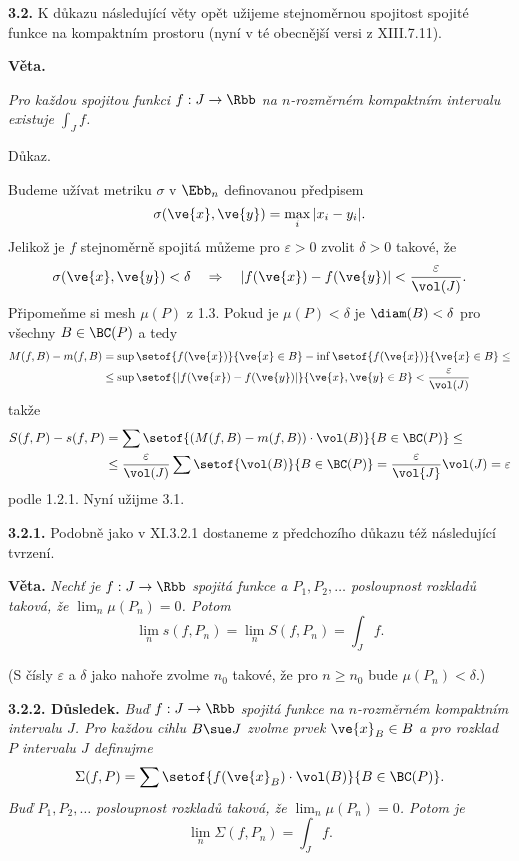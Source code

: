 \documentclass[12pt]{article}
\begin{document}
\bigskip


{\bf 3.2.} K důkazu následující věty opět užijeme stejnoměrnou spojitost spojité funkce na kompaktním prostoru (nyní v té obecnější versi z XIII.7.11).

\medskip


 {\bf Věta.} {\em Pro každou spojitou funkci  $f:J\to\Rbb$ na  $n$-rozměrném kompaktním intervalu existuje
$\int_Jf$.

Důkaz.} Budeme užívat metriku $\sigma$ v $\Ebb_n$ definovanou předpisem
$$
\sigma(\ve{x},\ve{y})=\max_i|x_i-y_i|.
$$ 
Jelikož je $f$ stejnoměrně spojitá můžeme pro $\varepsilon>0$ zvolit $\delta>0$ takové, že
$$
\sigma(\ve{x},\ve{y})< \delta \quad\Rightarrow\quad |f(\ve{x})-f(\ve{y})|< \frac{\varepsilon}{\vol(J)}.
$$
Připomeňme si  mesh $\mu(P)$ z 1.3.   Pokud je $\mu(P)<\delta$ je $\diam(B)<\delta$ pro všechny $B\in\BC(P)$
a tedy
$$
\begin{aligned}
M(f,B)-m(f,B)&=\sup\setof{f(\ve{x})}{\ve{x}\in B}-\inf\setof{f(\ve{x})}{\ve{x}\in B}\leq
\\
 &\leq\sup\setof{|f(\ve{x})-f(\ve{y})|}{\ve{x},\ve{y}\in B}<\frac{\varepsilon}{\vol(J)}
 \end{aligned}
 $$
takže
 $$
 \begin{aligned}
 S(f,P)-s(f,P)&=\sum\setof{(M(f,B)-m(f,B))\cdot\vol(B)}{B\in\BC(P)}\leq\\
&\leq\frac{\varepsilon}{\vol(J)}\sum\setof{\vol(B)}{B\in\BC(P)}=\frac{\varepsilon}{\vol{J}}\vol(J)=\varepsilon
 \end{aligned}
 $$
 podle 1.2.1. 
Nyní užijme 3.1. \sq
 
 \medskip
 
 {\bf 3.2.1.} Podobně jako v XI.3.2.1  dostaneme z předchozího důkazu též následující tvrzení.
 
 \smallskip
 
 {\bf Věta.} {\em  Nechť je   $f:J\to\Rbb$ spojitá funkce a $P_1,P_2,\dots$ posloupnost rozkladů taková, že 
 $\lim_n\mu(P_n)=0$. Potom
 $$
 \lim_n s(f,P_n)=\lim_n S(f,P_n)=\int_J f.
 $$}
 
 (S čísly $\varepsilon$ a $\delta$ jako nahoře zvolme $n_0$ takové, že pro $n\geq n_0$ bude $\mu(P_n)<\delta$.)
 
 \medskip

{\bf 3.2.2. Důsledek.} {\em Buď   $f:J\to\Rbb$ spojitá funkce na  $n$-rozměrném kompaktním
 intervalu $J$. Pro každou cihlu $B\sue J$ zvolme prvek $\ve{x}_B\in B$ a pro rozklad $P$ intervalu $J$
definujme
 $$
 \Sigma(f,P)=\sum\setof{f(\ve{x}_B)\cdot\vol(B)}{B\in\BC(P)}.
 $$
Buď $P_1,P_2,\dots$ posloupnost rozkladů taková, že
 $\lim_n\mu(P_n)=0$. Potom je
 $$
 \lim_n \Sigma(f,P_n)=\int_J f.
 $$}
 
\end{document}
